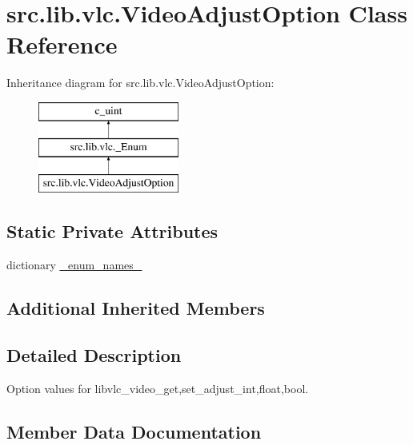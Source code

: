 \hypertarget{classsrc_1_1lib_1_1vlc_1_1VideoAdjustOption}{}\section{src.\+lib.\+vlc.\+Video\+Adjust\+Option Class Reference}
\label{classsrc_1_1lib_1_1vlc_1_1VideoAdjustOption}
Inheritance diagram for src.\+lib.\+vlc.\+Video\+Adjust\+Option\+:\begin{figure}[H]
\begin{center}
\leavevmode
\includegraphics[height=3.000000cm]{classsrc_1_1lib_1_1vlc_1_1VideoAdjustOption}
\end{center}
\end{figure}
\subsection*{Static Private Attributes}
\begin{DoxyCompactItemize}
\item 
dictionary \hyperlink{classsrc_1_1lib_1_1vlc_1_1VideoAdjustOption_aac7ce12bf5da69f9fc78c55cbeea76f4}{\+\_\+enum\+\_\+names\+\_\+}
\end{DoxyCompactItemize}
\subsection*{Additional Inherited Members}


\subsection{Detailed Description}
\begin{DoxyVerb}Option values for libvlc_video_{get,set}_adjust_{int,float,bool}.
\end{DoxyVerb}
 

\subsection{Member Data Documentation}
\hypertarget{classsrc_1_1lib_1_1vlc_1_1VideoAdjustOption_aac7ce12bf5da69f9fc78c55cbeea76f4}{}
